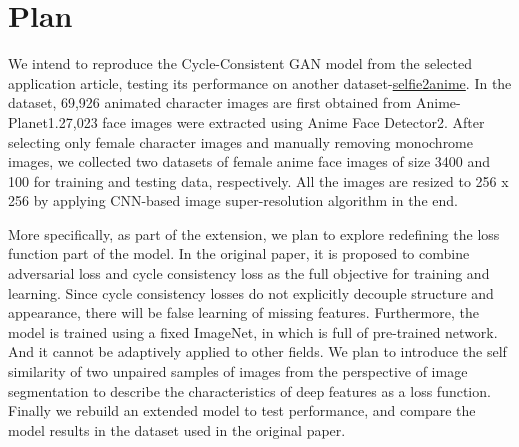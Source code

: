\section{Plan}

We intend to reproduce the Cycle-Consistent GAN model from the selected application article\cite{zhu_unpaired_2017}, testing its performance on another dataset-\href{https://paperswithcode.com/dataset/selfie2anime}{selfie2anime}.
In the dataset, 69,926 animated character images are first obtained from Anime-Planet1.27,023 face images were extracted using Anime Face Detector2. 
After selecting only female character images and manually removing monochrome images, we collected two datasets of female anime face images of size 3400 and 100 for training and testing data, respectively. 
All the images are resized to 256 x 256 by applying CNN-based image super-resolution algorithm in the end.

More specifically, as part of the extension, we plan to explore redefining the loss function part of the model. 
In the original paper, it is proposed to combine adversarial loss and cycle consistency loss as the full objective for training and learning. 
Since cycle consistency losses do not explicitly decouple structure and appearance, there will be false learning of missing features. 
Furthermore, the model is trained using a fixed ImageNet, in which is full of pre-trained network. 
And it cannot be adaptively applied to other fields. 
We plan to introduce the self similarity of two unpaired samples of images from the perspective of image segmentation to describe the characteristics of deep features as a loss function. \cite{chuanxia2021the}
Finally we rebuild an extended model to test performance, and compare the model results in the dataset used in the original paper.
